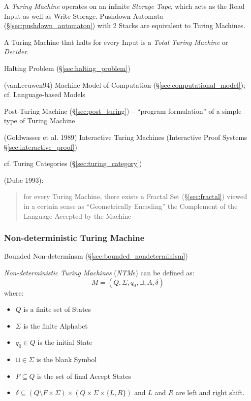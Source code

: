 A \emph{Turing Machine} operates on an infinite \emph{Storage Tape}, which acts
as the Read Input as well as Write Storage. Pushdown Automata
(\S\ref{sec:pushdown_automaton}) with 2 Stacks are equivalent to Turing
Machines.

A Turing Machine that halts for every Input is a \emph{Total Turing Machine} or
\emph{Decider}.

\fist Halting Problem (\S\ref{sec:halting_problem})

(vanLeeuwen94) Machine Model of Computation (\S\ref{sec:computational_model});
cf. Language-based Models

\fist Post-Turing Machine (\S\ref{sec:post_turing}) -- ``program formulation''
of a simple type of Turing Machine

\fist (Goldwasser et al. 1989) Interactive Turing Machines (Interactive Proof
Systems \S\ref{sec:interactive_proof})

\fist cf. Turing Categories (\S\ref{sec:turing_category})

(Dube 1993):
\begin{quote}
  for every Turing Machine, there exists a Fractal Set (\S\ref{sec:fractal})
  viewed in a certain sense as ``Geometrically Encoding'' the Complement of the
  Language Accepted by the Machine
\end{quote}



\subsubsection{Non-deterministic Turing Machine}
\label{sec:nondeterministic_turing_machine}

\fist Bounded Non-determinsm (\S\ref{sec:bounded_nondeterminism})

\emph{Non-deterministic Turing Machines} (\emph{NTM}s) can be defined
as:
\[
  M = (Q, \Sigma, q_0, \sqcup, A, \delta)
\]
where:
\begin{itemize}
  \item $Q$ is a finite set of States
  \item $\Sigma$ is the finite Alphabet
  \item $q_0 \in Q$ is the initial State
  \item $\sqcup \in \Sigma$ is the blank Symbol
  \item $F \subseteq Q$ is the set of final Accept States
  \item $\delta \subseteq (Q \setminus F \times \Sigma) \times (Q
    \times \Sigma \times \{L,R\})$ and $L$ and $R$ are left and right
    shift.
\end{itemize}

